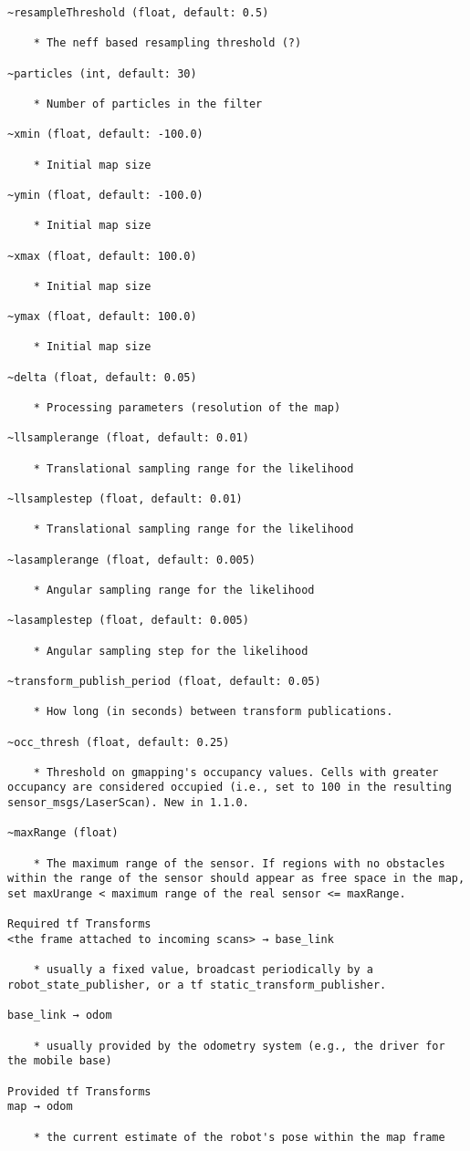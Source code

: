\begin{verbatim}
~resampleThreshold (float, default: 0.5)

    * The neff based resampling threshold (?) 

~particles (int, default: 30)

    * Number of particles in the filter 

~xmin (float, default: -100.0)

    * Initial map size 

~ymin (float, default: -100.0)

    * Initial map size 

~xmax (float, default: 100.0)

    * Initial map size 

~ymax (float, default: 100.0)

    * Initial map size 

~delta (float, default: 0.05)

    * Processing parameters (resolution of the map) 

~llsamplerange (float, default: 0.01)

    * Translational sampling range for the likelihood 

~llsamplestep (float, default: 0.01)

    * Translational sampling range for the likelihood 

~lasamplerange (float, default: 0.005)

    * Angular sampling range for the likelihood 

~lasamplestep (float, default: 0.005)

    * Angular sampling step for the likelihood 

~transform_publish_period (float, default: 0.05)

    * How long (in seconds) between transform publications. 

~occ_thresh (float, default: 0.25)

    * Threshold on gmapping's occupancy values. Cells with greater occupancy are considered occupied (i.e., set to 100 in the resulting sensor_msgs/LaserScan). New in 1.1.0. 

~maxRange (float)

    * The maximum range of the sensor. If regions with no obstacles within the range of the sensor should appear as free space in the map, set maxUrange < maximum range of the real sensor <= maxRange. 

Required tf Transforms
<the frame attached to incoming scans> → base_link

    * usually a fixed value, broadcast periodically by a robot_state_publisher, or a tf static_transform_publisher. 

base_link → odom

    * usually provided by the odometry system (e.g., the driver for the mobile base) 

Provided tf Transforms
map → odom

    * the current estimate of the robot's pose within the map frame 
\end{verbatim}
